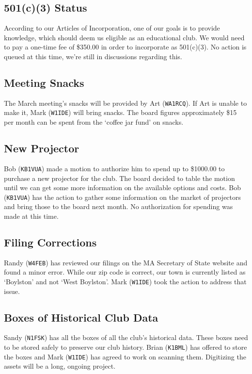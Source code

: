 \documentclass[10pt,letterpaper]{article}
\begin{document}
\subsection{501(c)(3) Status}
According to our Articles of Incorporation, one of our goals is to provide knowledge, which should deem us eligible as an educational club. We would need to pay a one-time fee of \$350.00 in order to incorporate as 501(c)(3). No action is queued at this time, we're still in discussions regarding this.

\subsection{Meeting Snacks}
The March meeting's snacks will be provided by Art (\texttt{WA1RCQ}). If Art is unable to make it, Mark (\texttt{W1IDE}) will bring snacks. The board figures approximately \$15 per month can be spent from the `coffee jar fund' on snacks.

\subsection{New Projector}
Bob (\texttt{KB1VUA}) made a motion to authorize him to spend up to \$1000.00 to purchase a new projector for the club. The board decided to table the motion until we can get some more information on the available options and costs. Bob (\texttt{KB1VUA}) has the action to gather some information on the market of projectors and bring those to the board next month. No authorization for spending was made at this time.

\subsection{Filing Corrections}
Randy (\texttt{W4FEB}) has reviewed our filings on the MA Secretary of State website and found a minor error. While our zip code is correct, our town is currently listed as `Boylston' and not `West Boylston'. Mark (\texttt{W1IDE}) took the action to address that issue.

\subsection{Boxes of Historical Club Data}
Sandy (\texttt{N1FSK}) has all the boxes of all the club's historical data. These boxes need to be stored safely to preserve our club history. Brian (\texttt{K1BML}) has offered to store the boxes and Mark (\texttt{W1IDE}) has agreed to work on scanning them. Digitizing the assets will be a long, ongoing project.
\end{document}
